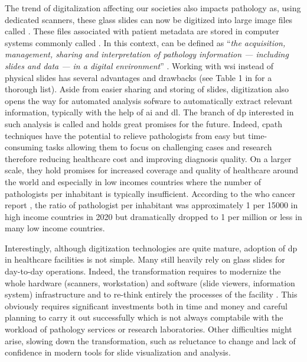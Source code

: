 The trend of digitalization affecting our societies also impacts pathology as, using dedicated scanners, these glass slides can now be digitized into large image files called . These files associated with patient metadata are stored in computer systems commonly called . In this context,  can be defined as ``\textit{the acquisition, management, sharing and interpretation of pathology information — including slides and data — in a digital environment}'' \parencite{doolan2019whatisdp}. Working with \acrshort{wsi} instead of physical slides has several advantages and drawbacks (see Table 1 in \parencite{jahn2020digital} for a thorough list). Aside from easier sharing and storing of slides, digitization also opens the way for automated analysis sofware to automatically extract relevant information, typically with the help of \acrlong{ai} and \acrlong{dl}. The branch of \acrlong{dp} interested in such analysis is called  and holds great promises for the future. Indeed, \acrshort{cpath} techniques have the potential to relieve pathologists from easy but time-consuming tasks allowing them to focus on challenging cases and research therefore reducing healthcare cost and improving diagnosis quality. On a larger scale, they hold promises for increased coverage and quality of healthcare around the world and especially in low incomes countries where the number of pathologists per inhabitant is typically insufficient. According to the \acrshort{who} cancer report \parencite{world2020report}, the ratio of pathologist per inhabitant was approximately 1 per 15000 in high income countries in 2020 but dramatically dropped to 1 per million or less in many low income countries. 

Interestingly, although digitization technologies are quite mature, adoption of \acrlong{dp} in healthcare facilities is not simple. Many still heavily rely on glass slides for day-to-day operations. Indeed, the transformation requires to modernize the whole hardware (scanners, workstation) and software (slide viewers, information system) infrastructure and to re-think entirely the processes of the facility \parencite{temprana2022digipatics}. This obviously requires significant investments both in time and money and careful planning to carry it out successfully which is not always comptabile with the workload of pathology services or research laboratories. Other difficulties might arise, slowing down the transformation, such as reluctance to change and lack of confidence in modern tools for slide visualization and analysis. 

